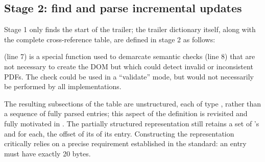 \subsection{Stage 2: find and parse incremental updates}
\label{sec:stage-2}
%
Stage 1 only finds the start of the trailer;
%
the trailer dictionary itself, along with the complete cross-reference table, are defined in stage 2 as follows:
%
\lstset{numbers=right}
\lstset{numbers=none}

 (line 7) is a special function used to demarcate semantic checks (line 8) that are not necessary to
create the DOM but which could detect invalid or inconsistent PDFs.
%
The check could be used in a ``validate'' mode, but would not necessarily be performed by all implementations.

The resulting subsections of the \xref{} table are unstructured, each of type , rather than a sequence of fully parsed \xref{} entries;
%
this aspect of the definition is revisited and fully motivated in .
%
The partially structured representation still retains a set of \objid{}'s and for each, the offset of its of its \xref{} entry.
%
Constructing the representation critically relies on a precise requirement established in the standard: an \xref{} entry must have exactly 20 bytes.

